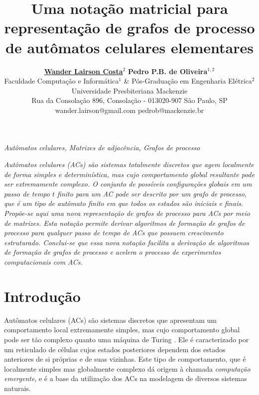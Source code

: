 \documentclass[a4,11pt]{article}
\begin{document}
\title{ \Large{\bf Uma notação matricial para representação de grafos de processo de autômatos celulares elementares}}

\author{ {\bf {\large \underline{Wander Lairson Costa}$^2$}} \hspace*{1cm} {\bf {\large
 Pedro P.B. de Oliveira$^{1,2}$}}  \\
 {\small Faculdade Computação e Informática$^1$ \& Pós-Graduação em Engenharia Elétrica$^2$} \\
 {\small Universidade Presbiteriana Mackenzie} \\
 {\small Rua da Consolação 896, Consolação - 013020-907 São Paulo, SP} \\
 {\small wander.lairson@gmail.com \hspace*{.2cm}  pedrob@mackenzie.br} }

\date{}

\maketitle

\thispagestyle{empty}
 {\it Autômatos celulares, Matrizes de adjacência, Grafos de processo}

\vspace{5ex}

\textit{Autômatos celulares (ACs) são sistemas totalmente discretos que agem
localmente de forma simples e determinística, mas cujo comportamento
global resultante pode ser extremamente complexo. O conjunto de possíveis
configurações globais em um passo de tempo $t$ finito para um AC pode ser
descrito por um grafo de processo, que é um tipo de autômato finito em que
todos os estados são iniciais e finais. Propõe-se aqui uma nova representação
de grafos de processo para ACs por meio de matrizes. Esta notação
permite derivar algoritmos de formação de grafos de processo para qualquer passo
de tempo de ACs que possuem crescimento estruturado.
Conclui-se que essa nova notação facilita a derivação de algoritmos de formação de
grafos de processo e acelera o processo de experimentos computacionais com ACs.}

\section{Introdução}

Autômatos celulares (ACs) são sistemas discretos que apresentam um comportamento
local extremamente simples, mas cujo comportamento global pode ser tão
complexo quanto uma máquina de Turing \cite{wolfram1984a}. Ele
é caracterizado por um reticulado de células cujos estados posteriores
dependem dos estados anteriores de si próprias e de suas vizinhas.
Este tipo de comportamento, que é localmente simples mas globalmente
complexo dá origem à chamada \textit{computação emergente}, e é
a base da utilização dos ACs na modelagem de diversos sistemas naturais.
\end{document}
